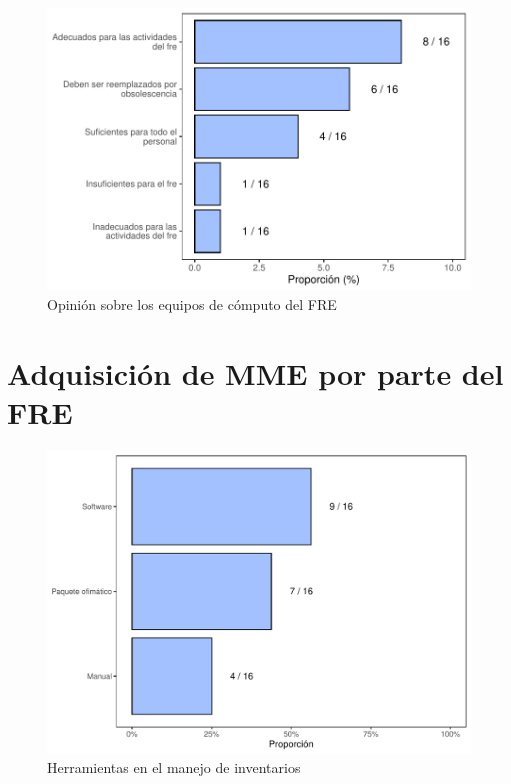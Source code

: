 \documentclass[
]{book}
\begin{document}
\begin{figure}
\includegraphics[width=0.85\linewidth]{InformeFinal_files/figure-latex/OpinionEquiposComputo-1} \caption{Opinión sobre los equipos de cómputo del FRE}\label{fig:OpinionEquiposComputo}
\end{figure}

\hypertarget{adquisiciuxf3n-de-mme-por-parte-del-fre}{%
\section{Adquisición de MME por parte del FRE}\label{adquisiciuxf3n-de-mme-por-parte-del-fre}}

\begin{figure}
\includegraphics[width=0.85\linewidth]{InformeFinal_files/figure-latex/HerramientasManejoInventarios-1} \caption{Herramientas en el manejo de inventarios}\label{fig:HerramientasManejoInventarios}
\end{figure}
\end{document}
